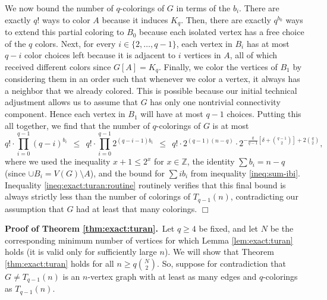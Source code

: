 \documentclass[11pt]{article}
\begin{document}
We now bound the number of $q$-colorings of $G$ in terms of the $b_i$.
There are exactly $q!$ ways to color $A$ because it induces $K_q$.
Then, there are exactly $q^{b_0}$ ways to extend this partial coloring
to $B_0$ because each isolated vertex has a free choice of the $q$
colors.  Next, for every $i \in \{2, \ldots, q-1\}$, each vertex in
$B_i$ has at most $q-i$ color choices left because it is adjacent to
$i$ vertices in $A$, all of which received different colors since
$G[A] = K_q$.  Finally, we color the vertices of $B_1$ by considering
them in an order such that whenever we color a vertex, it always has a
neighbor that we already colored.  This is possible because our
initial technical adjustment allows us to assume that $G$ has only one
nontrivial connectivity component.  Hence each vertex in $B_1$ will
have at most $q-1$ choices.  Putting this all together, we find that
the number of $q$-colorings of $G$ is at most
\begin{displaymath}
  q! \cdot \prod_{i=0}^{q-1} (q-i)^{b_i}
  \ \ \leq \ \ 
  q! \cdot \prod_{i=0}^{q-1} 2^{(q-i-1)b_i} 
  \ \ \leq \ \ 
  q! \cdot 2^{(q-1)(n-q)} \cdot 2^{
    -\frac{q}{q-1} \left[ \delta + {q-1 \choose 2} \right] 
    + 2 {q \choose 2}},
\end{displaymath}
where we used the inequality $x+1 \leq 2^x$ for $x \in \mathbb{Z}$,
the identity $\sum b_i = n-q$ (since $\cup B_i = V(G) \setminus A$),
and the bound for $\sum i b_i$ from inequality \eqref{ineq:sum-ibi}.
Inequality \ref{ineq:exact:turan:routine} routinely verifies that this
final bound is always strictly less than the number of colorings of
$T_{q-1}(n)$, contradicting our assumption that $G$ had at least that
many colorings.  \hfill $\Box$



\vspace{3mm}



\noindent \textbf{Proof of Theorem \ref{thm:exact:turan}.}\, Let $q
\geq 4$ be fixed, and let $N$ be the corresponding minimum number of
vertices for which Lemma \ref{lem:exact:turan} holds (it is valid only
for sufficiently large $n$).  We will show that Theorem
\ref{thm:exact:turan} holds for all $n \geq q {N \choose 2}$.  So,
suppose for contradiction that $G \neq T_{q-1}(n)$ is an $n$-vertex
graph with at least as many edges and $q$-colorings as $T_{q-1}(n)$.
\end{document}
